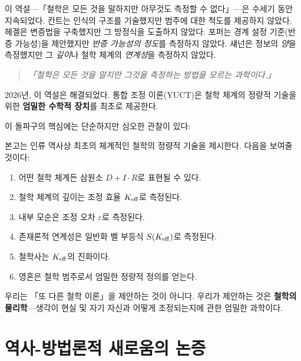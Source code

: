 \documentclass[11pt,a4paper]{article}
\newcommand{\eps}{\varepsilon}
\begin{document}
	이 역설—「철학은 모든 것을 말하지만 아무것도 측정할 수 없다」—은 수세기 동안 지속되었다. 칸트는 인식의 구조를 기술했지만 범주에 대한 척도를 제공하지 않았다. 헤겔은 변증법을 구축했지만 그 방정식을 도출하지 않았다. 포퍼는 경계 설정 기준(반증 가능성)을 제안했지만 \emph{반증 가능성의 정도}를 측정하지 않았다. 섀넌은 정보의 \emph{양}을 측정했지만 그 \emph{깊이}나 철학 체계의 \emph{연계성}을 측정하지 않았다.
	
	\begin{quote}
		\textit{「철학은 모든 것을 알지만 그것을 측정하는 방법을 모르는 과학이다.」}
	\end{quote}
	
	2026년, 이 역설은 해결되었다. 통합 조정 이론(YUCT)은 철학 체계의 정량적 기술을 위한 \textbf{엄밀한 수학적 장치}를 최초로 제공한다.
	
	이 돌파구의 핵심에는 단순하지만 심오한 관찰이 있다:
	
	\begin{center}
	\end{center}
	
	본고는 인류 역사상 최초의 체계적인 철학의 정량적 기술을 제시한다. 다음을 보여줄 것이다:
	
	\begin{enumerate}
		\item 어떤 철학 체계든 삼원소 \(D + I \cdot R\)로 표현될 수 있다.
		\item 철학 체계의 깊이는 조정 효율 \(\Keff\)로 측정된다.
		\item 내부 모순은 조정 오차 \(\eps\)로 측정된다.
		\item 존재론적 연계성은 일반화 벨 부등식 \(S(\Keff)\)로 측정된다.
		\item 철학사는 \(\Keff\)의 진화이다.
		\item 영혼은 철학 범주로서 엄밀한 정량적 정의를 얻는다.
	\end{enumerate}
	
	우리는 「또 다른 철학 이론」을 제안하는 것이 아니다. 우리가 제안하는 것은 \textbf{철학의 물리학}—생각이 현실 및 자기 자신과 어떻게 조정되는지에 관한 엄밀한 과학이다.
	
	\section{역사-방법론적 새로움의 논증}
	
\end{document}
